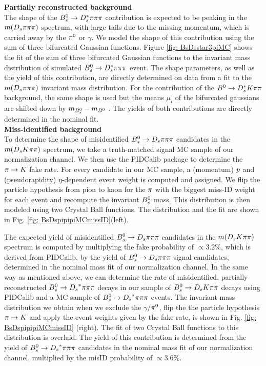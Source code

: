 \noindent \textbf{Partially reconstructed background}  \\
The shape of the  ${{B}^0_{s}}\rightarrow D_s^{*}{\pi}{\pi}{\pi}$ contribution is expected to be peaking in the $m({{D}_{s}}{\pi}{\pi}{\pi})$ spectrum, with large tails due to the missing momentum, which is carried away by the ${{\pi}^0}$ or $\gamma$. 
We model the shape of this contribution using the sum of three bifurcated Gaussian functions.
Figure \ref{fig: BsDsstar3piMC} shows the fit of the sum of three bifurcated Gaussian functions to the invariant mass distribution of simulated ${{B}^0_{s}}\rightarrow D_s^{*}{\pi}{\pi}{\pi}$ event. 
The shape parameters, 
as well as the yield of this contribution, are directly determined on data from a fit to the $m({{D}_{s}}{\pi}{\pi}{\pi})$ invariant mass distribution. 
For the contribution of the ${{B}^0}\rightarrow D_s^{*}{K}{\pi}{\pi}$ background, the same shape is used but the means $\mu_{i}$ of the bifurcated gaussians are shifted down by $m_{{{B}^0_{s}}} - m_{{{B}^0}}$ \cite{Agashe:2014kda}. 
The yields of both contributions are directly determined in the nominal fit. \\

\noindent\textbf{Miss-identified background}  \\
To determine the shape of misidentified ${{B}^0_{s}}\rightarrow{\ensuremath{{D}_{s}}}{\ensuremath{\pi}}{\ensuremath{\pi}}{\ensuremath{\pi}}$ candidates in the $m({{D}_{s}}{K}{\pi}{\pi})$ spectrum, we take a truth-matched signal MC sample of our normalization channel. 
We then use the PIDCalib package to determine the ${\pi}\rightarrow{\ensuremath{K}}$ fake rate. For every candidate in our MC sample, a (momentum) $\mbox{$p$}$ and (pseudorapidity) $\eta$-dependent event weight is computed and assigned. 
We flip the particle hypothesis from pion to kaon for the ${\pi}$ with the biggest miss-ID weight for each event and recompute the invariant ${{B}^0_{s}}$ mass. This distribution is then modeled using two Crystal Ball functions. 
The distribution and the fit are shown in Fig. \ref{fig: BsDspipipiMCmissID}(left). 

The expected yield of misidentified ${{B}^0_{s}}\rightarrow{\ensuremath{{D}_{s}}}{\ensuremath{\pi}}{\ensuremath{\pi}}{\ensuremath{\pi}}$ candidates in the $m({{D}_{s}}{K}{\pi}{\pi})$ spectrum is computed by multiplying the fake probability of $\propto3.2\%$, which is derived from PIDCalib, by the yield of ${{B}^0_{s}}\rightarrow{\ensuremath{{D}_{s}}}{\ensuremath{\pi}}{\ensuremath{\pi}}{\ensuremath{\pi}}$ signal candidates, determined in the nominal mass fit of our normalization channel.  \newline
In the same way as mentioned above, we can determine the rate of misidentified, partially reconstructed ${{B}^0_{s}}\rightarrow{\ensuremath{{D}_{s}}}^{*}{\pi}{\pi}{\pi}$ decays in our sample of ${{B}^0_{s}}\rightarrow{\ensuremath{{D}_{s}}}{\ensuremath{K}}{\ensuremath{\pi}}{\ensuremath{\pi}}$ decays using PIDCalib and a MC sample of ${{B}^0_{s}}\rightarrow{\ensuremath{{D}_{s}}}^{*}{\pi}{\pi}{\pi}$ events. The invariant mass distribution we obtain when we exclude the $\gamma$/${{\pi}^0}$, flip the the particle hypothesis ${\pi}\rightarrow{\ensuremath{K}}$ and apply the event weights given by the fake rate, is shown in Fig. \ref{fig: BsDspipipiMCmissID} (right). The fit of two Crystal Ball functions to this distribution is overlaid. 
The yield of this contribution is determined from the yield of ${{B}^0_{s}}\rightarrow{\ensuremath{{D}_{s}}}^{*}{\pi}{\pi}{\pi}$ candidates in the nominal mass fit of our normalization channel, multiplied by the misID probability of $\propto 3.6\%$.

